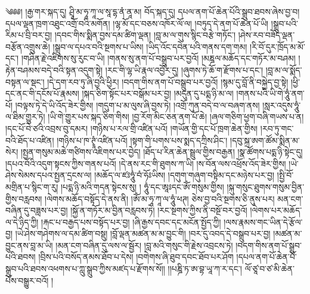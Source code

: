 \setcounter{footnote}{0} 
༄༅༅། །རྒྱ་གར་སྐད་དུ། ཤྲཱི་མ་ཧཱ་ཀཱ་ལ་སཱ་དྷ་ནཾ་ནཱ་མ། བོད་སྐད་དུ། དཔལ་ནག་པོ་ཆེན་པོའི་སྒྲུབ་ཐབས་ཞེས་བྱ་བ། དཔལ་ལྡན་ཁྲག་འཐུང་འགྲོ་བའི་མགོན། །ལྷ་མོ་དང་བཅས་འཁོར་ལོ་ལ། །བཏུད་དེ་ནག་པོ་ཆེན་པོ་ཡི། །སྒྲུབ་པའི་རིམ་པ་བྲི་བར་བྱ། །དབང་གིས་སྨིན་བྱས་དམ་ཚིག་ལྡན། །བླ་མ་ལ་གུས་སྙིང་བརྩེ་གཏོང་། །ཤེས་རབ་བཟོད་ལྡན་བརྩོན་འགྲུས་ཆེ། །སྒྲུབ་ལ་དཔའ་བའི་སྔགས་པ་ཡིས། །ཡིད་འོང་དབེན་པའི་གནས་དག་གམ། །རི་བོ་དུར་ཁྲོད་མ་མོ་དང་། །གཤིན་རྗེ་འཇིགས་སུ་རུང་བ་ཡི། །གནས་སུ་ནག་པོ་བསྒྲུབ་པར་བྱའོ། །མཎྜལ་མཆོད་དང་གཏོར་མ་བཤམ། །རྟེན་བཤམས་བདེ་བའི་སྟན་འདུག་སྟེ། །རང་གི་ལྷ་ཡི་རྣལ་འབྱོར་དུ། །ཞུགས་ཏེ་ཆོ་ག་རྫོགས་པ་དང་། །བླ་མ་ལ་སྨོད་བསྟན་ལ་སྡང་། །དེ་དག་རབ་ཏུ་ཞི་བྱའི་ཕྱིར། །བདག་གིས་ནག་པོ་བསྒྲུབ་པར་བྱའོ། །སྙམ་དུ་བློ་ནི་བསྐྱེད་བྱ་སྟེ། །ཕྱི་དང་ནང་གི་དངོས་པོ་རྣམས། །སྐད་ཅིག་སྟོང་པར་བསྒོམ་པར་བྱ། །མདུན་དུ་པདྨ་ཉི་མ་ལ། །གནས་པའི་ཡི་གེ་ཧཱུཾ་ནག་པོ། །བལྟས་ཏེ་དེ་ཡི་འོད་ཟེར་གྱིས། །གདུག་པ་མ་ལུས་ཞི་བྱས་ཏེ། །འགྲོ་ཀུན་བདེ་བ་ལ་བཞག་ནས། །སླར་འདུས་ཧཱུཾ་ལ་ཐིམ་གྱུར་ཏེ། །ཡི་གེ་གྱུར་པས་སྐད་ཅིག་གིས། །བྱ་རོག་མིང་ཅན་ནག་པོ་ཆེ། །ཞལ་གཅིག་ཕྱག་བཞི་གཡས་པ་ན། །དང་པོ་བེ་ཙའི་འབྲས་བུ་དམར། །གཉིས་པ་རལ་གྲི་འཛིན་པའོ། །གཡོན་གྱི་དང་པོ་ཁྲག་ཆེན་གྱིས། །རབ་ཏུ་གང་བའི་ཐོད་པ་འཛིན། །གཉིས་པ་ཁ་ཊྭཱཾ་འཛིན་པའོ། །སྟག་གི་པགས་པས་སྨད་དཀྲིས་ཤིང་། །དབུ་སྐྲ་ཨག་ཚོམ་སྨིན་མ་སེར། །སྤྱན་གསུམ་མཆེ་གཙིགས་འཇིགས་པར་བྱེད། །ཐོད་པ་རིན་ཆེན་སྦྲུལ་གྱིས་བརྒྱན། །སྣ་ཚོགས་པདྨ་ཉི་སྟེང་དུ། །དཔའ་བོའི་འདུག་སྟངས་ཀྱིས་གནས་པའོ། །དེ་ནས་རང་གི་ཐུགས་ཀ་ཡི། །ས་བོན་ལས་འཕྲོས་འོད་ཟེར་གྱིས། །ཡེ་ཤེས་སེམས་དཔའ་སྤྱན་དྲངས་ལ། །མཆོད་ལ་ཛཿཧཱུཾ་བཾ་ཧོཿཡིས། །དགུག་གཞུག་བསྟིམ་དང་མཉེས་པར་བྱ། །སྤྱི་བོ་མགྲིན་པ་སྙིང་ག་རུ། །པདྨ་ཉི་མའི་གདན་སྟེངས་སུ། །
ཧཱུཾ་དང་ཨཱཿདང་ཨོཾ་གསུམ་གྱིས། །སྐུ་གསུང་ཐུགས་གསུམ་བྱིན་གྱིས་བརླབས། །ལེགས་མཆོད་བསྟོད་དེ་ནས་ནི། །ཨོཾ་མ་ཧཱ་ཀཱ་ལ་ཧཱུཾ་ཕཊ། ཅེས་བྱ་བའི་སྔགས་ཅི་ནུས་པར། མན་ངག་བཞིན་དུ་བཟླས་པར་བྱ། །སྐྱོ་ན་གཏོར་མ་བྱིན་བརླབས་ཏེ། །རང་སྔགས་ཀྱིས་ནི་བསྔོ་བར་བྱའོ། །ལེགས་པར་མཆོད་ལ་དེ་ཉིད་ཀྱི། །རྐང་པ་བརྒྱད་པས་བསྟོད་པར་བྱ། །ཞི་རྒྱས་དབང་དང་མངོན་སྤྱོད་ཀྱི། །ལས་རྣམས་གང་ཡིན་དེ་རྩོལ་བྱ། །ཡེ་ཤེས་གཤེགས་ལ་དམ་ཚིག་བསྡུ། །བློ་ལྡན་མཚན་མ་མ་བྱུང་གི། །བར་དུ་འབད་དེ་བསྒྲུབ་པར་བྱ། །མཚན་མ་བྱུང་ནས་བླ་མ་ཡི། །མན་ངག་བཞིན་དུ་ལས་ལ་སྦྱོར། །བླ་མའི་གསུང་གི་རྗེས་འབྲངས་ཏེ། །བདག་གིས་ནག་པོ་སྒྲུབ་པའི་ཐབས། །བྲིས་པའི་བསོད་ནམས་ཐོབ་པ་དེས། །བགེགས་ཞི་ཐུབ་དབང་ཐོབ་པར་ཤོག །དཔལ་ནག་པོ་ཆེན་པོ་སྒྲུབ་པའི་ཐབས་འཕགས་པ་ཀླུ་སྒྲུབ་ཀྱིས་མཛད་པ་རྫོགས་སོ།། །།པཎྜི་ཏ་ཨ་བྷ་ཡཱ་ཀ་ར་དང་། ལོ་ཙཱ་བ་ཙ་མི་ཆེན་པོས་བསྒྱུར་བའོ། །